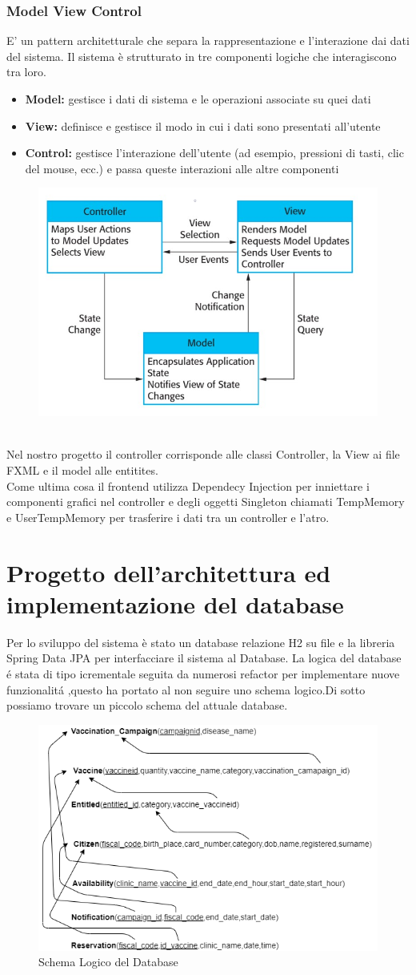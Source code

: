 \documentclass[a4paper,12pt,openany,oneside]{book}
\begin{document}
\subsubsection{Model View Control}
E' un pattern architetturale che separa la rappresentazione e l'interazione dai dati del sistema.
Il sistema è strutturato in tre componenti logiche che interagiscono tra loro.
\begin{itemize}
  \item \textbf{Model:} gestisce i dati di sistema e le operazioni associate su
quei dati
  \item \textbf{View:} definisce e gestisce il modo in cui i dati sono presentati all'utente
    \item \textbf{Control:} gestisce l'interazione dell'utente (ad esempio, pressioni di tasti, clic del mouse, ecc.) e passa queste interazioni alle altre componenti
\end{itemize}
\newpage
\begin{figure}[h] 
\centering
\includegraphics[width=0.5\columnwidth]{MVCdiagram.png} 
\caption{}
\end{figure}
\\Nel nostro progetto il controller corrisponde alle classi Controller, la View ai file FXML e il model alle entitites.\\
Come ultima cosa il frontend utilizza Dependecy Injection per inniettare i componenti grafici nel controller e degli oggetti Singleton chiamati TempMemory e UserTempMemory per trasferire i dati tra un controller e l'atro.
\section{Progetto dell’architettura ed implementazione del database}
Per lo sviluppo del sistema è stato un database relazione H2 su file e la libreria Spring Data JPA per interfacciare il sistema al Database. La logica del database é stata di tipo icrementale seguita da numerosi refactor per implementare nuove funzionalitá ,questo ha portato al non seguire uno schema logico.Di sotto possiamo trovare un piccolo schema del attuale database. 
\begin{figure}[h] 
\centering
\includegraphics[width=0.5\columnwidth]{logicDB.png} 
\caption{Schema Logico del Database}
\end{figure}
\newpage
\end{document}
